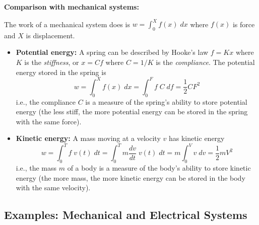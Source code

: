 \documentclass{article}
\begin{document}
{\bf Comparison with mechanical systems:}

The work of a mechanical system does is $w=\int_0^X f(x)\; dx$ where $f(x)$ 
is force and $X$ is displacement.
\begin{itemize}		
\item {\bf Potential energy:} A spring can be described by Hooke's law $f=Kx$
  where $K$ is the {\em stiffness}, or $x=Cf$ where $C=1/K$ is the 
  {\em compliance}. The potential energy stored in the spring is
  \begin{equation}
    w=\int_0^X f(x)\;dx=\int_0^F f\;C\;df=\frac{1}{2}CF^2	
  \end{equation}	
  i.e., the compliance $C$ is a measure of the spring's ability to 
  store potential energy (the less stiff, the more potential energy can
  be stored in the spring with the same force).
\item {\bf Kinetic energy:} A mass moving at a velocity $v$ has kinetic
  energy
  \begin{equation}
    w=\int_0^T f\;v(t)\;dt=\int_0^T m \frac{dv}{dt}\;v(t)\;dt
    =m \int_0^V v\;dv=\frac{1}{2}mV^2 
  \end{equation}
  i.e., the mass $m$ of a body is a measure of the body's ability to 
  store kinetic energy (the more mass, the more kinetic energy can be 
  stored in the body with the same velocity).
\end{itemize}		

\subsection*{Examples: Mechanical and Electrical Systems}
\end{document}
